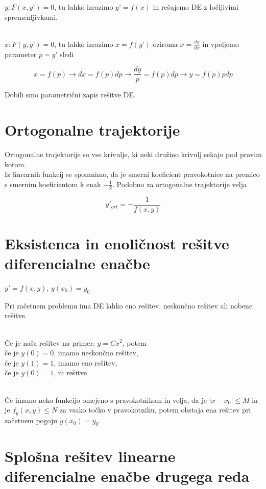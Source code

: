 \documentclass[12pt]{report}
\begin{document}
$y : F(x,y’) = 0$, tu lahko izrazimo $y’ = f(x)$ in rešujemo DE z ločljivimi spremenljivkami.\\\

$x : F(y,y’) = 0$, tu lahko izrazimo $x = f(y’)$  oziroma $x = \frac{dy}{dx}$ in vpeljemo parameter $p = y’$
sledi 

\[
x = f(p) \rightarrow dx = f(p) dp \rightarrow \frac{dy}{p} = f(p) dp \rightarrow y = f(p) p dp\]

Dobili smo parametrični zapis rešitve DE.


\section*{Ortogonalne trajektorije}

Ortogonalne trajektorije so vse krivulje, ki neki družino krivulj sekajo pod pravim kotom.\\ Iz linearnih funkcij se spomnimo, da je smerni koeficient pravokotnice na premico s smernim koeficientom k enak $-\frac{1}{k}$. Podobno za ortogonalne trajektorije velja 

\[y'_{ort}= -\frac{1}{f(x,y)}\]


\section*{Eksistenca in enoličnost rešitve diferencialne enačbe}

$y'=f(x,y)$, $y(x_0)=y_0$

Pri začetnem problemu ima DE lahko eno rešitev, neskončno rešitev ali nobene rešitve.\\\

Če je naša rešitev na primer: $y = Cx^2$, potem\\
če je $y(0) = 0$,  imamo neskončno rešitev,\\
če je $y(1) = 1 $,  imamo eno rešitev,\\
če je $y(0) = 1$,  ni rešitve\\\

Če imamo neko funkcijo omejeno s pravokotnikom in velja, da je $|x-x_0| \leq M$ in je $f_y(x,y) \leq N$ za vsako točko v pravokotniku, potem obstaja ena rešitev pri začetnem pogoju $y(x_0) = y_0$.


\section*{Splošna rešitev linearne diferencialne enačbe drugega reda}
\end{document}
